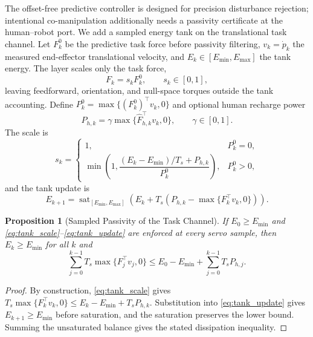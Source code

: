 \documentclass[journal]{IEEEtran}
\newtheorem{proposition}{Proposition}
\begin{document}
The offset-free predictive controller is designed for precision disturbance
rejection; intentional co-manipulation additionally needs a passivity
certificate at the human--robot port. We add a sampled energy tank on the
translational task channel. Let $F_k^0$ be the predictive task force before
passivity filtering, $v_k=\dot p_k$ the measured end-effector translational
velocity, and $E_k\in[E_{\min},E_{\max}]$ the tank energy. The layer scales
only the task force,
\begin{equation}\label{eq:tank_scale_force}
  F_k=s_kF_k^0,\qquad s_k\in[0,1],
\end{equation}
leaving feedforward, orientation, and null-space torques outside the tank
accounting. Define $P_k^0=\max\{(F_k^0)^\top v_k,0\}$ and optional human
recharge power
\begin{equation*}
  P_{h,k}=\gamma\max\{\hat F_{h,k}^\top v_k,0\},\qquad \gamma\in[0,1].
\end{equation*}
The scale is
\begin{equation}\label{eq:tank_scale}
s_k=
\begin{cases}
1, & P_k^0=0,\\[1mm]
\min\!\left(1,\dfrac{(E_k-E_{\min})/T_s+P_{h,k}}{P_k^0}\right), & P_k^0>0,
\end{cases}
\end{equation}
and the tank update is
\begin{equation}\label{eq:tank_update}
E_{k+1}=\operatorname{sat}_{[E_{\min},E_{\max}]}
\!\left(E_k+T_s(P_{h,k}-\max\{F_k^\top v_k,0\})\right).
\end{equation}

\begin{proposition}[Sampled Passivity of the Task Channel]\label{prop:tank}
If $E_0\ge E_{\min}$ and \eqref{eq:tank_scale}--\eqref{eq:tank_update}
are enforced at every servo sample, then $E_k\ge E_{\min}$ for all $k$ and
\begin{equation*}
\sum_{j=0}^{k-1}T_s\max\{F_j^\top v_j,0\}
\le E_0-E_{\min}+\sum_{j=0}^{k-1}T_sP_{h,j}.
\end{equation*}
\end{proposition}
\begin{proof}
By construction, \eqref{eq:tank_scale} gives
$T_s\max\{F_k^\top v_k,0\}\le E_k-E_{\min}+T_sP_{h,k}$. Substitution into
\eqref{eq:tank_update} gives $E_{k+1}\ge E_{\min}$ before saturation, and
the saturation preserves the lower bound. Summing the unsaturated balance
gives the stated dissipation inequality.
\end{proof}
\end{document}
